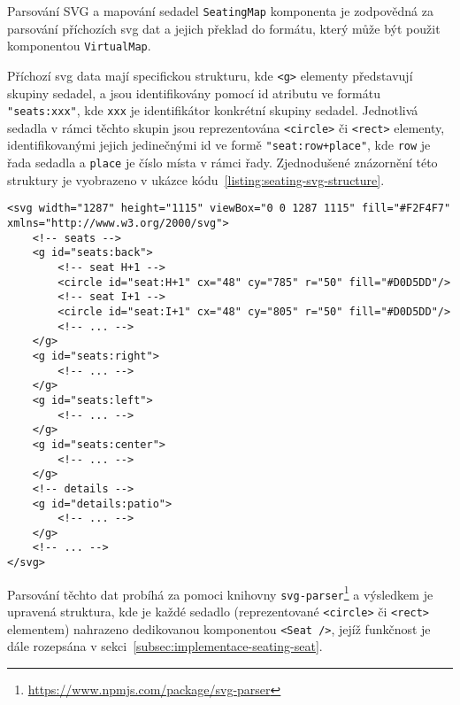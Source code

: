 \begin{subsection}{Parsování SVG a mapování sedadel}
    \label{subsec:implementace-seating-svg}
    \texttt{SeatingMap} komponenta je zodpovědná za parsování příchozích \ac{svg} dat a jejich překlad do formátu, který může být použit komponentou \texttt{VirtualMap}.

    Příchozí \ac{svg} data mají specifickou strukturu, kde \texttt{<g>} elementy představují skupiny sedadel, a jsou identifikovány pomocí id atributu ve formátu \texttt{"seats:xxx"}, kde \texttt{xxx} je identifikátor konkrétní skupiny sedadel.
    Jednotlivá sedadla v rámci těchto skupin jsou reprezentována \texttt{<circle>} či \texttt{<rect>} elementy, identifikovanými jejich jedinečnými id ve formě \texttt{"seat:row+place"}, kde \texttt{row} je řada sedadla a \texttt{place} je číslo místa v rámci řady.
    Zjednodušené znázornění této struktury je vyobrazeno v ukázce kódu~\ref{listing:seating-svg-structure}.

    \begin{listing}[H]
        \begin{verbatim}
<svg width="1287" height="1115" viewBox="0 0 1287 1115" fill="#F2F4F7" xmlns="http://www.w3.org/2000/svg">
    <!-- seats -->
    <g id="seats:back">
        <!-- seat H+1 -->
        <circle id="seat:H+1" cx="48" cy="785" r="50" fill="#D0D5DD"/>
        <!-- seat I+1 -->
        <circle id="seat:I+1" cx="48" cy="805" r="50" fill="#D0D5DD"/>
        <!-- ... -->
    </g>
    <g id="seats:right">
        <!-- ... -->
    </g>
    <g id="seats:left">
        <!-- ... -->
    </g>
    <g id="seats:center">
        <!-- ... -->
    </g>
    <!-- details -->
    <g id="details:patio">
        <!-- ... -->
    </g>
    <!-- ... -->
</svg>
        \end{verbatim}
        \caption{Ukázka struktury \ac{svg} dat}
        \label{listing:seating-svg-structure}
    \end{listing}

    Parsování těchto dat probíhá za pomoci knihovny \texttt{svg-parser}\footnote{\url{https://www.npmjs.com/package/svg-parser}} a výsledkem je upravená struktura, kde je každé sedadlo (reprezentované \texttt{<circle>} či \texttt{<rect>} elementem) nahrazeno dedikovanou komponentou \texttt{<Seat />}, jejíž funkčnost je dále rozepsána v sekci~\ref{subsec:implementace-seating-seat}.
\end{subsection}

